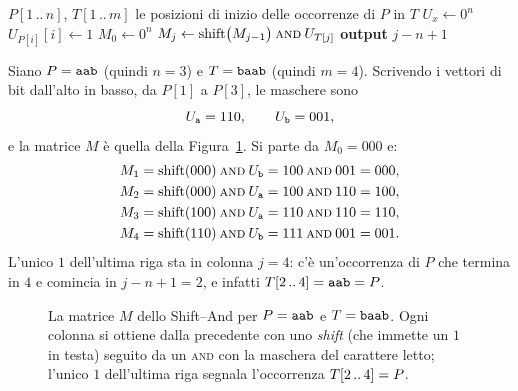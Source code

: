 \begin{algorithm}[H]
\caption{\textsc{Shift-And}}\label{alg:shift-and}
\begin{algorithmic}[1]
\Require $P[1\,..\,n]$, $T[1\,..\,m]$
\Ensure le posizioni di inizio delle occorrenze di $P$ in $T$
  \State $U_x \gets 0^n$
\EndFor
{}
  \State $U_{P[i]}[i] \gets 1$ 
\EndFor
\State $M_0 \gets 0^n$
  \State $M_j \gets \operatorname{shift}\bigl(M_{j-1}\bigr) \mathbin{\textsc{and}} U_{T[j]}$
    \State \textbf{output} $j-n+1$
  \EndIf
\EndFor
\end{algorithmic}
\end{algorithm}

\begin{esempio}
Siano $P=\texttt{aab}$ (quindi $n=3$) e $T=\texttt{baab}$ (quindi $m=4$). Scrivendo i vettori di bit
dall'alto in basso, da $P[1]$ a $P[3]$, le maschere sono
\[
  U_{\texttt{a}}=110,\qquad U_{\texttt{b}}=001,
\]
e la matrice $M$ è quella della Figura~\ref{fig:shift-and-esempio}. Si parte da $M_0=000$ e:
\[
  \begin{aligned}
    M_1 &= \operatorname{shift}(000)\mathbin{\textsc{and}}U_{\texttt{b}} = 100\mathbin{\textsc{and}}001 = 000, \\
    M_2 &= \operatorname{shift}(000)\mathbin{\textsc{and}}U_{\texttt{a}} = 100\mathbin{\textsc{and}}110 = 100, \\
    M_3 &= \operatorname{shift}(100)\mathbin{\textsc{and}}U_{\texttt{a}} = 110\mathbin{\textsc{and}}110 = 110, \\
    M_4 &= \operatorname{shift}(110)\mathbin{\textsc{and}}U_{\texttt{b}} = 111\mathbin{\textsc{and}}001 = 001 .
  \end{aligned}
\]
L'unico $1$ dell'ultima riga sta in colonna $j=4$: c'è un'occorrenza di $P$ che termina in $4$ e
comincia in $j-n+1=2$, e infatti $T[2\,..\,4]=\texttt{aab}=P$.
\end{esempio}

\begin{figure}[H]
\centering

\caption{La matrice $M$ dello Shift--And per $P=\texttt{aab}$ e $T=\texttt{baab}$. Ogni colonna si
ottiene dalla precedente con uno \emph{shift} (che immette un $1$ in testa) seguito da un
\textsc{and} con la maschera del carattere letto; l'unico $1$ dell'ultima riga segnala
l'occorrenza $T[2\,..\,4]=P$.}
\label{fig:shift-and-esempio}
\end{figure}


